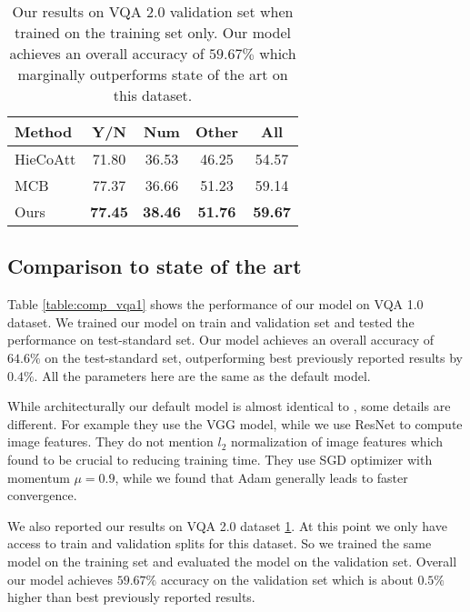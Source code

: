\documentclass[10pt,twocolumn,letterpaper]{article}
\begin{document}
\begin{table}
	\footnotesize
	\centering
	\tabcolsep=0.4cm
	\begin{tabular}{l c c c c}
		\toprule
		Method & Y/N & Num & Other & All \\ 
		\midrule
		HieCoAtt \cite{Lu2016HierarchicalQC} & 71.80 & 36.53 & 46.25 & 54.57 \\
		MCB \cite{Fukui2016MultimodalCB} & 77.37 & 36.66 & 51.23 & 59.14 \\
		\midrule
		Ours & \textbf{77.45} & \textbf{38.46} & \textbf{51.76} & \textbf{59.67} \\
		\bottomrule
	\end{tabular}
	\vspace{.1cm}
	\caption{Our results on VQA 2.0 \cite{Goyal2016MakingTV} validation set when trained on the training set only. Our model achieves an overall accuracy of $59.67\%$ which marginally outperforms state of the art on this dataset.} 
	\label{table:comp_vqa2}
\end{table}

\subsection{Comparison to state of the art}
Table \ref{table:comp_vqa1} shows the performance of our model on VQA 1.0 dataset. We trained our model on train and validation set and tested the performance on test-standard set. Our model achieves an overall accuracy of $64.6\%$ on the test-standard set, outperforming best previously reported results by $0.4\%$. All the parameters here are the same as the default model. 

While architecturally our default model is almost identical to \cite{Yang2016StackedAN}, some details are different. For example they use the VGG \cite{Simonyan2014Very} model, while we use ResNet \cite{He2016DeepRL} to compute image features. They do not mention $l_2$ normalization of image features which found to be crucial to reducing training time.
They use SGD optimizer with momentum $\mu = 0.9$, while we found that Adam \cite{Kingma2014AdamAM} generally leads to faster convergence. 

We also reported our results on VQA 2.0 dataset \ref{table:comp_vqa2}. At this point we only have access to train and validation splits for this dataset. So we trained the same model on the training set and evaluated the model on the validation set. Overall our model achieves $59.67\%$ accuracy on the validation set which is about $0.5\%$ higher than best previously reported results.
\end{document}
